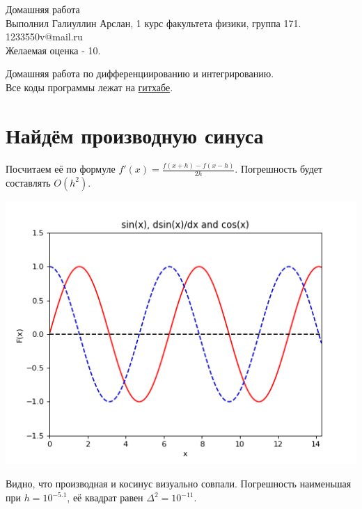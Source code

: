 \documentclass[12pt,a4paper]{scrartcl}
\author{А. А. Галиуллин}
\begin{document}
	
	\begin{center}
		\large
		Домашняя работа \\
		Выполнил Галиуллин Арслан, 1 курс факультета физики, группа 171. \\
		1233550v@mail.ru \\
		Желаемая оценка - 10.
	\end{center}

	Домашняя работа по дифференциированию и интегрированию.\\Все коды программы лежат на \href{https://github.com/Fenribel/HW4.git}{гитхабе}.
	\section{Найдём производную синуса }
		Посчитаем её по формуле $f'(x) = \frac{f(x+h) - f(x-h)}{2h}$. Погрешность будет составлять $O(h^2)$.

		\begin{center}
			\includegraphics[scale=0.8]{figure_1} \\
		\end{center}
		Видно, что производная и косинус визуально совпали. Погрешность наименьшая при $h = 10^{-5.1}$, её квадрат равен $\Delta^2 = 10^{-11}$.
\end{document}

